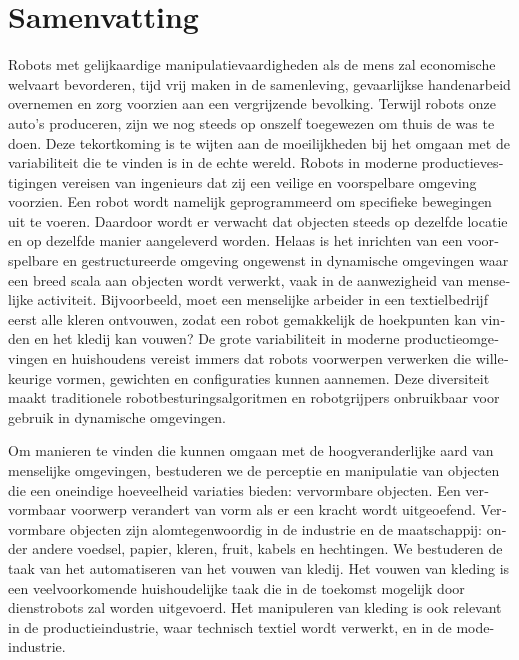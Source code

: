 \documentclass[\home/main.tex]{subfiles}
\begin{document}
\chapter{Samenvatting}

\begin{otherlanguage}{dutch}

Robots met gelijkaardige manipulatievaardigheden als de mens zal economische welvaart bevorderen, tijd vrij maken in de samenleving, gevaarlijkse handenarbeid overnemen en zorg voorzien aan een vergrijzende bevolking. 
Terwijl robots onze auto's produceren, zijn we nog steeds op onszelf toegewezen om thuis de was te doen.
Deze tekortkoming is te wijten aan de moeilijkheden bij het omgaan met de variabiliteit die te vinden is in de echte wereld.
Robots in moderne productievestigingen vereisen van ingenieurs dat zij een veilige en voorspelbare omgeving voorzien. Een robot wordt namelijk geprogrammeerd om specifieke bewegingen uit te voeren. Daardoor wordt er verwacht dat objecten steeds op dezelfde locatie en op dezelfde manier aangeleverd worden.
Helaas is het inrichten van een voorspelbare en gestructureerde omgeving ongewenst in dynamische omgevingen waar een breed scala aan objecten wordt verwerkt, vaak in de aanwezigheid van menselijke activiteit. Bijvoorbeeld, moet een menselijke arbeider in een textielbedrijf eerst alle kleren ontvouwen, zodat een robot gemakkelijk de hoekpunten kan vinden en het kledij kan vouwen?
De grote variabiliteit in moderne productieomgevingen en huishoudens vereist immers dat robots voorwerpen verwerken die willekeurige vormen, gewichten en configuraties kunnen aannemen. Deze diversiteit maakt traditionele robotbesturingsalgoritmen en robotgrijpers onbruikbaar voor gebruik in dynamische omgevingen.

Om manieren te vinden die kunnen omgaan met de hoogveranderlijke aard van menselijke omgevingen, bestuderen we de perceptie en manipulatie van objecten die een oneindige hoeveelheid variaties bieden: vervormbare objecten. Een vervormbaar voorwerp verandert van vorm als er een kracht wordt uitgeoefend. Vervormbare objecten zijn alomtegenwoordig in de industrie en de maatschappij: onder andere voedsel, papier, kleren, fruit, kabels en hechtingen. We bestuderen de taak van het automatiseren van het vouwen van kledij. Het vouwen van kleding is een veelvoorkomende huishoudelijke taak die in de toekomst mogelijk door dienstrobots zal worden uitgevoerd. Het manipuleren van kleding is ook relevant in de productieindustrie, waar technisch textiel wordt verwerkt, en in de mode-industrie.


\end{otherlanguage}
\end{document}
